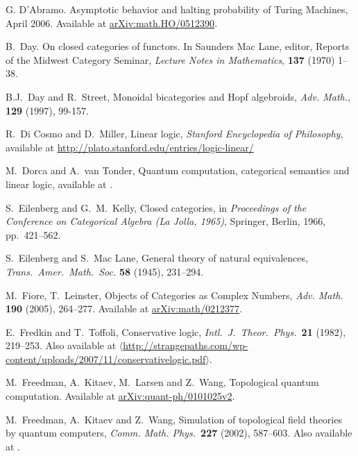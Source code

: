 \documentclass[12pt,twoside,openright]{report}
\begin{document}
\begin{thebibliography}{99}
 G. D'Abramo. Asymptotic behavior and halting probability of Turing Machines, April 2006.  Available at \href{http://arxiv.org/abs/math/0512390}{arXiv:math.HO/0512390}.

 B.\ Day. On closed categories of functors. In Saunders Mac Lane, editor, Reports of the Midwest Category Seminar, {\sl Lecture Notes in Mathematics}, \textbf{137} (1970) 1--38.

 B.J.\ Day and R.\ Street, Monoidal bicategories and Hopf algebroids, \textsl{Adv. Math.}, \textbf{129} (1997), 99-157.

 R.\ Di Cosmo and D.\ Miller, Linear logic,
{\sl Stanford Encyclopedia of Philosophy}, available at 
\href{http://plato.stanford.edu/entries/logic-linear/}
{http://plato.stanford.edu/entries/logic-linear/}

 M.\ Dorca and A.\ van Tonder, Quantum computation, categorical semantics and linear logic, available at .
 
S.\ Eilenberg and G.\ M.\ Kelly, Closed categories, in
{\sl Proceedings of the Conference on Categorical Algebra (La Jolla, 
1965)}, Springer, Berlin, 1966, pp.\ 421--562.

S.\ Eilenberg and S.\ Mac Lane, General theory of natural equivalences, \textsl{Trans.\ Amer.\ Math.\ Soc.} 
\textbf{58} (1945), 231--294.

 M.\ Fiore, T.\ Leinster, Objects of Categories as Complex Numbers, \textsl{Adv. Math.} \textbf{190} (2005), 264--277.  Available at \href{http://arxiv.org/abs/math/0212377}{arXiv:math/0212377}.

 E.\ Fredkin and T.\ Toffoli, Conservative logic, 
\textit{Intl.\ J.\ Theor.\ Phys.\ }\textbf{21} (1982), 219--253. Also available at 
\hfill \break
\href{http://strangepaths.com/wp-content/uploads/2007/11/conservativelogic.pdf}
{$\langle$http://strangepaths.com/wp-content/uploads/2007/11/conservativelogic.pdf$\rangle$}.

 M.\ Freedman, A.\ Kitaev, M.\ Larsen and Z.\ Wang, Topological quantum computation.  Available at \href{http://arxiv.org/abs/quant-ph/0101025}{arXiv:quant-ph/0101025v2}.

 M.\ Freedman, A.\ Kitaev and Z.\ Wang, Simulation of topological field theories by quantum computers, {\sl Comm. Math. Phys.\ }{\bf 227}
(2002), 587--603.  Also available at .


\end{thebibliography}
\end{document}
